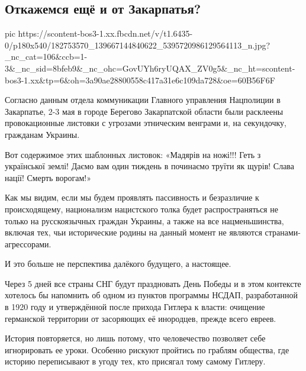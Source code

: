  
 
 
 
 
\subsection{Откажемся ещё и от Закарпатья?}
\label{sec:04_05_2021.fb.zharkih_ekaterina.1.zakarpatie}

\ifcmt
  pic https://scontent-bos3-1.xx.fbcdn.net/v/t1.6435-0/p180x540/182753570_139667144840622_5395720986129564113_n.jpg?_nc_cat=106&ccb=1-3&_nc_sid=8bfeb9&_nc_ohc=GovUYh6ryUQAX_ZV0g5&_nc_ht=scontent-bos3-1.xx&tp=6&oh=3a90ae28800558c417a31e6c109da728&oe=60B56F6F
\fi

Согласно данным отдела коммуникации Главного управления Нацполиции в
Закарпатье, 2-3 мая в городе Берегово Закарпатской области были расклеены
провокационные листовки с угрозами этническим венграми и, на секундочку,
гражданам Украины.

Вот содержимое этих шаблонных листовок: «Мадярів на ножі!!! Геть з української
землі! Даємо вам один тиждень в починаємо труїти як щурів! Слава нації! Смерть
ворогам!»

Как мы видим, если мы будем проявлять пассивность и безразличие к
происходящему, национализм нацистского толка будет распространяться не только
на русскоязычных граждан Украины, а также на все нацменьшинства, включая тех,
чьи исторические родины на данный момент не являются странами-агрессорами. 

И это больше не перспектива далёкого будущего, а настоящее.

Через 5 дней все страны СНГ будут праздновать День Победы и в этом контексте
хотелось бы напомнить об одном из пунктов программы НСДАП, разработанной в 1920
году и утверждённой после прихода Гитлера к власти: очищение германской
территории от засоряющих её инородцев, прежде всего евреев.

История повторяется, но лишь потому, что человечество позволяет себе
игнорировать ее уроки. Особенно рискуют пройтись по граблям общества, где
историю переписывают в угоду тех, кто присягал тому самому Гитлеру.

